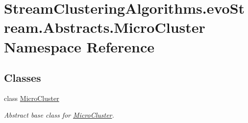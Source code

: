 \hypertarget{namespaceStreamClusteringAlgorithms_1_1evoStream_1_1Abstracts_1_1MicroCluster}{}\section{Stream\+Clustering\+Algorithms.\+evo\+Stream.\+Abstracts.\+Micro\+Cluster Namespace Reference}
\label{namespaceStreamClusteringAlgorithms_1_1evoStream_1_1Abstracts_1_1MicroCluster}
\subsection*{Classes}
\begin{DoxyCompactItemize}
\item 
class \hyperlink{classStreamClusteringAlgorithms_1_1evoStream_1_1Abstracts_1_1MicroCluster_1_1MicroCluster}{Micro\+Cluster}
\begin{DoxyCompactList}\small\item\em Abstract base class for \hyperlink{classStreamClusteringAlgorithms_1_1evoStream_1_1Abstracts_1_1MicroCluster_1_1MicroCluster}{Micro\+Cluster}. \end{DoxyCompactList}\end{DoxyCompactItemize}
